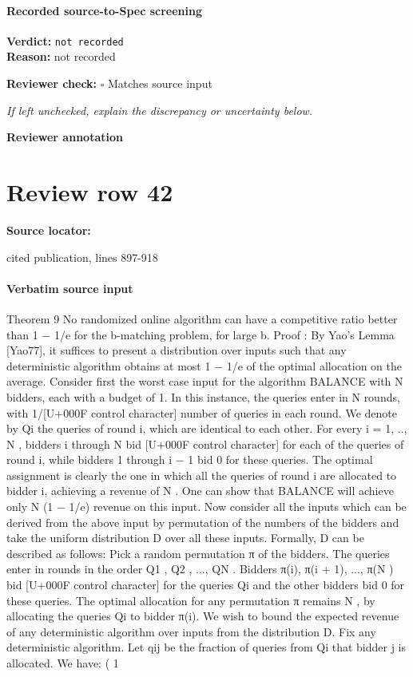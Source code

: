 \documentclass[10pt]{article}
\newcommand{\reviewerbox}{%
  \par\noindent\fbox{\parbox{0.96\linewidth}{\rule{0pt}{0.38in}}}\par
}
\newcommand{\reviewmatch}[1]{%
  \par\noindent\textbf{Reviewer check:} $\square$\; #1\par
  \noindent\emph{If left unchecked, explain the discrepancy or uncertainty below.}\par
}
\begin{document}
\paragraph{Recorded source-to-Spec screening}
\textbf{Verdict:} \texttt{not recorded}
\\
\textbf{Reason:} not recorded
\reviewmatch{Matches source input}
\noindent\textbf{Reviewer annotation}\par
\reviewerbox
\clearpage
\hypertarget{source-claim-97c572cc7a66e662}{}
\section*{Review row 42}
\textbf{Source locator:} {\footnotesize\raggedright cited publication, lines 897-\allowbreak{}918\par}
\paragraph{Verbatim source input}
\begin{ReviewVerbatim}
Theorem 9 No randomized online algorithm can have a competitive ratio better than 1 − 1/e
for the b-matching problem, for large b.
Proof : By Yao’s Lemma [Yao77], it suffices to present a distribution over inputs such that
any deterministic algorithm obtains at most 1 − 1/e of the optimal allocation on the average.
Consider first the worst case input for the algorithm BALANCE with N bidders, each with
a budget of 1. In this instance, the queries enter in N rounds, with 1/[U+000F control character] number of queries in
each round. We denote by Qi the queries of round i, which are identical to each other. For
every i = 1, .., N , bidders i through N bid [U+000F control character] for each of the queries of round i, while bidders 1
through i − 1 bid 0 for these queries. The optimal assignment is clearly the one in which all
the queries of round i are allocated to bidder i, achieving a revenue of N . One can show that
BALANCE will achieve only N (1 − 1/e) revenue on this input.
Now consider all the inputs which can be derived from the above input by permutation of the
numbers of the bidders and take the uniform distribution D over all these inputs. Formally, D
can be described as follows: Pick a random permutation π of the bidders. The queries enter
in rounds in the order Q1 , Q2 , ..., QN . Bidders π(i), π(i + 1), ..., π(N ) bid [U+000F control character] for the queries Qi
and the other bidders bid 0 for these queries. The optimal allocation for any permutation
π remains N , by allocating the queries Qi to bidder π(i). We wish to bound the expected
revenue of any deterministic algorithm over inputs from the distribution D.
Fix any deterministic algorithm. Let qij be the fraction of queries from Qi that bidder j is
allocated. We have:
(
1
\end{ReviewVerbatim}
\end{document}
